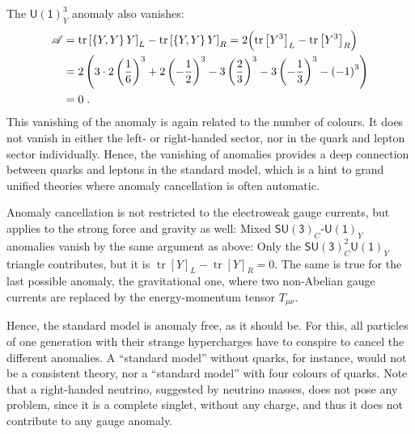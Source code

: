 \documentclass[12pt]{report}
\DeclareMathOperator{\tr}{tr}
\newcommand{\2}{\ensuremath{\sqrt{2}\,}}
\begin{document}
{        The $\mathsf{U(1)}_Y^3$ anomaly also vanishes:
        \begin{align}
          \begin{split}
            \mathscr{A} &= \tr \left[\left\{Y,Y\right\}Y\right]_L - \tr
            \left[\left\{Y,Y\right\}Y\right]_R = 2 \Bigl(\tr \left[Y^3\right]_L -\tr
              \left[Y^3\right]_R \Bigr)\\
            &= 2\left(3\cdot 2\left(\frac{1}{6}\right)^3 + 2
              \left(-\frac{1}{2}\right)^3 -3\left(\frac{2}{3}\right)^3 -3\left(-\frac{1}{3}\right)^3
              -\left(-1\right)^3 \right)\\
            &=0 \;.
          \end{split}
        \end{align}
        This vanishing of the anomaly is again related to the number of colours. It does not vanish in
        either the left- or right-handed sector, nor in the quark and lepton sector
        individually. Hence, the vanishing of anomalies provides a deep connection between quarks and 
        leptons in the
        standard model, which is a hint to grand unified theories where anomaly cancellation is often
        automatic.
        
        Anomaly cancellation is not restricted to the electroweak gauge currents, but applies to the
        strong force and gravity as well: Mixed $\mathsf{SU(3)}_C$-$\mathsf{U(1)}_Y$ anomalies
        vanish by the same argument as above: 
        Only the $\mathsf{SU(3)}_C^2\mathsf{U(1)}_Y$ triangle contributes, but it is $\tr
        \left[Y\right]_L -\tr \left[Y\right]_R =0$. The same is true for the last possible anomaly,
        the gravitational one, where two non-Abelian gauge currents are replaced by the 
        energy-momentum tensor $T_{\mu\nu}$.

        Hence, the standard model is anomaly free, as it should be. For this, all
        particles of one generation with their strange hypercharges have to  conspire
        to cancel the different anomalies. A ``standard model'' without quarks, for instance, 
        would not
        be a consistent theory, nor a ``standard model'' with four colours of quarks. Note that
        a right-handed neutrino, suggested by neutrino masses, does not pose any problem,
        since it is a complete singlet, without any charge, and thus it does not
        contribute to any gauge anomaly.
    
}
\end{document}
